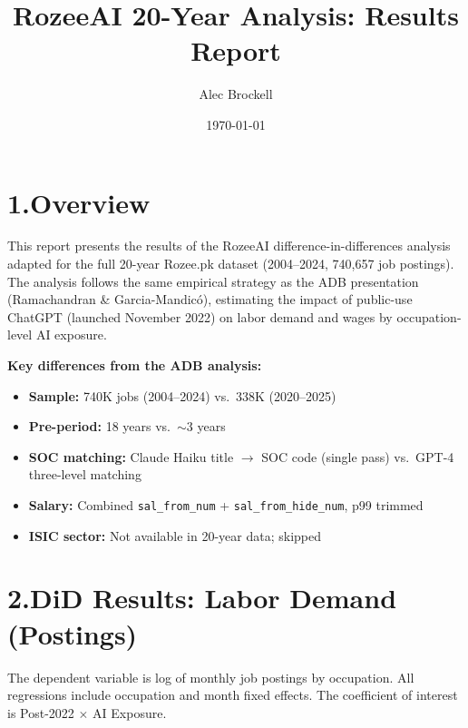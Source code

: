 \documentclass[11pt]{article}
\title{RozeeAI 20-Year Analysis: Results Report}
\author{Alec Brockell}
\date{\today}
\begin{document}
\maketitle

\section*{1.\quad Overview}

This report presents the results of the RozeeAI difference-in-differences analysis adapted for the full 20-year Rozee.pk dataset (2004--2024, 740,657 job postings). The analysis follows the same empirical strategy as the ADB presentation (Ramachandran \& Garcia-Mandic\'{o}), estimating the impact of public-use ChatGPT (launched November 2022) on labor demand and wages by occupation-level AI exposure.

\noindent \textbf{Key differences from the ADB analysis:}
\begin{itemize}
    \item \textbf{Sample:} 740K jobs (2004--2024) vs.\ 338K (2020--2025)
    \item \textbf{Pre-period:} 18 years vs.\ $\sim$3 years
    \item \textbf{SOC matching:} Claude Haiku title $\to$ SOC code (single pass) vs.\ GPT-4 three-level matching
    \item \textbf{Salary:} Combined \texttt{sal\_from\_num} + \texttt{sal\_from\_hide\_num}, p99 trimmed
    \item \textbf{ISIC sector:} Not available in 20-year data; skipped
\end{itemize}



\clearpage
\section*{2.\quad DiD Results: Labor Demand (Postings)}

The dependent variable is log of monthly job postings by occupation. All regressions include occupation and month fixed effects. The coefficient of interest is Post-2022 $\times$ AI Exposure.

\vspace{0.5cm}
\end{document}
